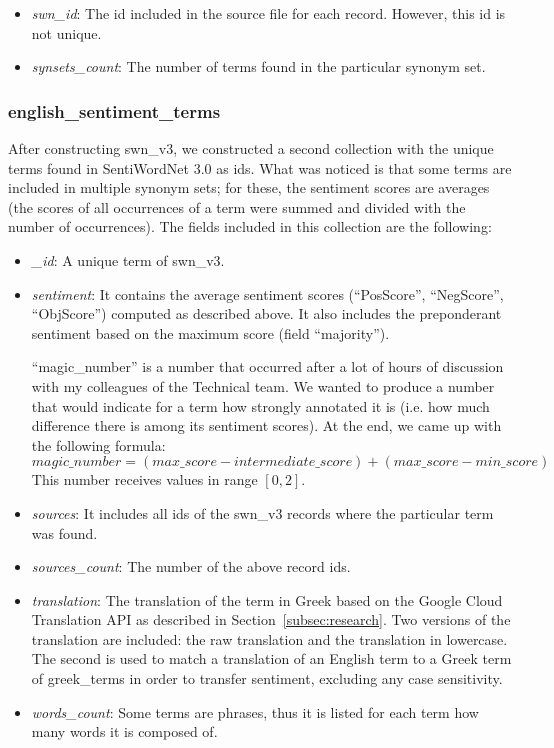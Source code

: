 \begin{itemize}
  \item \emph{swn\_id}: The id included in the source file for each record.
  However, this id is not unique.
  
  \item \emph{synsets\_count}: The number of terms
  found in the particular synonym set.
\end{itemize}

\subsubsection{english\_sentiment\_terms}
\label{subsubsec:english-sentiment-terms}

After constructing swn\_v3,
we constructed a second collection
with the unique terms found in SentiWordNet 3.0 as ids.
What was noticed is that some terms are included
in multiple synonym sets;
for these, the sentiment scores are averages
(the scores of all occurrences of a term were summed
and divided with the number of occurrences).
The fields included in this collection are the following:

\begin{itemize}
 \item \emph{\_id}: A unique term of swn\_v3.

 \item \emph{sentiment}: It contains the average sentiment scores
 (``PosScore'', ``NegScore'', ``ObjScore'') computed as described above.
 It also includes the preponderant sentiment based on the maximum score
 (field ``majority'').

 ``magic\_number'' is a number that occurred after a lot of hours
 of discussion with my colleagues of the Technical team.
 We wanted to produce a number that would indicate for a term
 how strongly annotated it is
 (i.e. how much difference there is among its sentiment scores).
 At the end, we came up with the following formula: \\
 $magic\_number = (max\_score - intermediate\_score) + (max\_score - min\_score)$ \\
 This number receives values in range $[0,2]$.
 
 \item \emph{sources}: It includes all ids of the swn\_v3 records
 where the particular term was found.
 
 \item \emph{sources\_count}: The number of the above record ids.
 
 \item \emph{translation}: The translation of the term in Greek
 based on the Google Cloud Translation API
 as described in Section~\ref{subsec:research}.
 Two versions of the translation are included:
 the raw translation and the translation in lowercase.
 The second is used to match a translation of an English term
 to a Greek term of greek\_terms in order to transfer sentiment,
 excluding any case sensitivity.
 
 \item \emph{words\_count}: Some terms are phrases, thus
 it is listed for each term how many words it is composed of.
\end{itemize}

